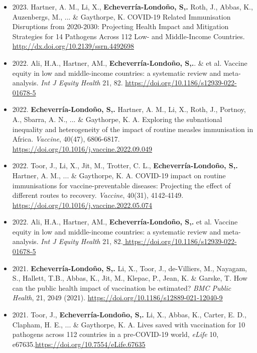\documentclass[10pt, a4paper]{article}
\begin{document}
\begin{minipage}[t]{0.9\textwidth}
\begin{itemize}
\item 2023. Hartner, A. M., Li, X., \textbf{Echeverr\'ia-Londo\~no, S,.} Roth, J., Abbas, K., Auzenbergs, M., ... \& Gaythorpe, K. COVID-19 Related Immunisation Disruptions from 2020-2030: Projecting Health Impact and Mitigation Strategies for 14 Pathogens Across 112 Low- and Middle-Income Countries. \url{http://dx.doi.org/10.2139/ssrn.4492698}

\item 2022. Ali, H.A., Hartner, AM., \textbf{Echeverr\'ia-Londo\~no, S,.}. \& et al. Vaccine equity in low and middle-income countries: a systematic review and meta-analysis. \textit{Int J Equity Health} 21, 82. \url{https://doi.org/10.1186/s12939-022-01678-5}

\item 2022. \textbf{Echeverr\'ia-Londo\~no, S,.}  Hartner, A. M., Li, X., Roth, J., Portnoy, A., Sbarra, A. N., ... \& Gaythorpe, K. A. Exploring the subnational inequality and heterogeneity of the impact of routine measles immunisation in Africa. \textit{Vaccine}, 40(47), 6806-6817. \url{https://doi.org/10.1016/j.vaccine.2022.09.049}

\item 2022. Toor, J., Li, X., Jit, M., Trotter, C. L., \textbf{Echeverr\'ia-Londo\~no, S,.}  Hartner, A. M., ... \& Gaythorpe, K. A. COVID-19 impact on routine immunisations for vaccine-preventable diseases: Projecting the effect of different routes to recovery. \textit{Vaccine}, 40(31), 4142-4149. \url{https://doi.org/10.1016/j.vaccine.2022.05.074}

\item 2022. Ali, H.A., Hartner, AM., \textbf{Echeverr\'ia-Londo\~no, S,.}  et al. Vaccine equity in low and middle-income countries: a systematic review and meta-analysis. \textit{Int J Equity Health} 21, 82.\url{ https://doi.org/10.1186/s12939-022-01678-5}

\item 2021. \textbf{Echeverr\'ia-Londo\~no, S,.}  Li, X., Toor, J., de-Villiers, M., Nayagam, S., Hallett, T.B., Abbas, K., Jit, M., Klepac, P., Jean, K. \&  Garske, T. How can the public health impact of vaccination be estimated? \textit{BMC Public Health}, 21, 2049 (2021). \url{https://doi.org/10.1186/s12889-021-12040-9}

\item 2021. Toor, J., \textbf{Echeverr\'ia-Londo\~no, S,.} Li, X., Abbas, K., Carter, E. D., Clapham, H. E., ... \& Gaythorpe, K. A. Lives saved with vaccination for 10 pathogens across 112 countries in a pre-COVID-19 world, \textit{eLife} 10, e67635.\url{https://doi.org/10.7554/eLife.67635}


\end{itemize}
\end{minipage}
\end{document}

